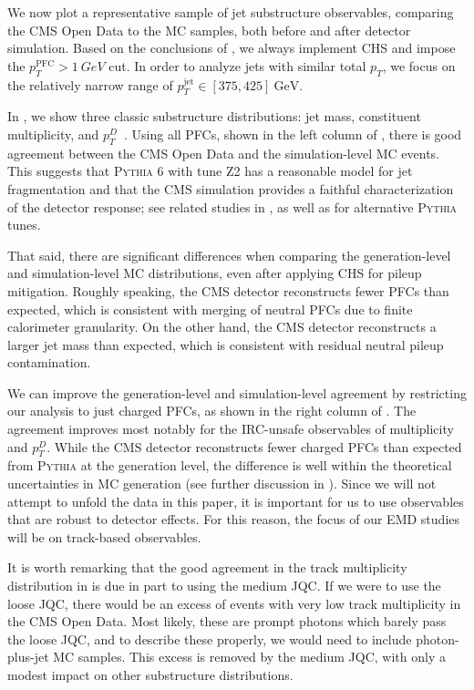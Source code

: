 \documentclass[aps,prd,twocolumn,preprintnumbers,nofootinbib,longbibliography,floatfix,superscriptaddress]{revtex4-1}
\begin{document}
We now plot a representative sample of jet substructure observables, comparing the CMS Open Data to the MC samples, both before and after detector simulation.
%
Based on the conclusions of , we always implement CHS and impose the $p_T^\text{PFC} > \SI{1}{GeV}$ cut.
%
In order to analyze jets with similar total $p_T$, we focus on the relatively narrow range of $p_T^\text{jet} \in [375,425]~\text{GeV}$.


In , we show three classic substructure distributions:  jet mass, constituent multiplicity, and $p_T^D$~\cite{CMS:2013kfa}.
%
Using all PFCs, shown in the left column of , there is good agreement between the CMS Open Data and the simulation-level MC events.
%
This suggests that \textsc{Pythia} 6 with tune Z2 has a reasonable model for jet fragmentation and that the CMS simulation provides a faithful characterization of the detector response; see related studies in , as well as  for alternative \textsc{Pythia} tunes.


That said, there are significant differences when comparing the generation-level and simulation-level MC distributions, even after applying CHS for pileup mitigation.
%
Roughly speaking, the CMS detector reconstructs fewer PFCs than expected, which is consistent with merging of neutral PFCs due to finite calorimeter granularity.
%
On the other hand, the CMS detector reconstructs a larger jet mass than expected, which is consistent with residual neutral pileup contamination.


We can improve the generation-level and simulation-level agreement by restricting our analysis to just charged PFCs, as shown in the right column of .
%
The agreement improves most notably for the IRC-unsafe observables of multiplicity and $p_T^D$.
%
While the CMS detector reconstructs fewer charged PFCs than expected from \textsc{Pythia} at the generation level, the difference is well within the theoretical uncertainties in MC generation (see further discussion in ).
%
Since we will not attempt to unfold the data in this paper, it is important for us to use observables that are robust to detector effects.
%
For this reason, the focus of our EMD studies will be on track-based observables.


It is worth remarking that the good agreement in the track multiplicity distribution in  is due in part to using the medium JQC.
%
If we were to use the loose JQC, there would be an excess of events with very low track multiplicity in the CMS Open Data.
%
Most likely, these are prompt photons which barely pass the loose JQC, and to describe these properly, we would need to include photon-plus-jet MC samples.
%
This excess is removed by the medium JQC, with only a modest impact on other substructure distributions.
\end{document}
